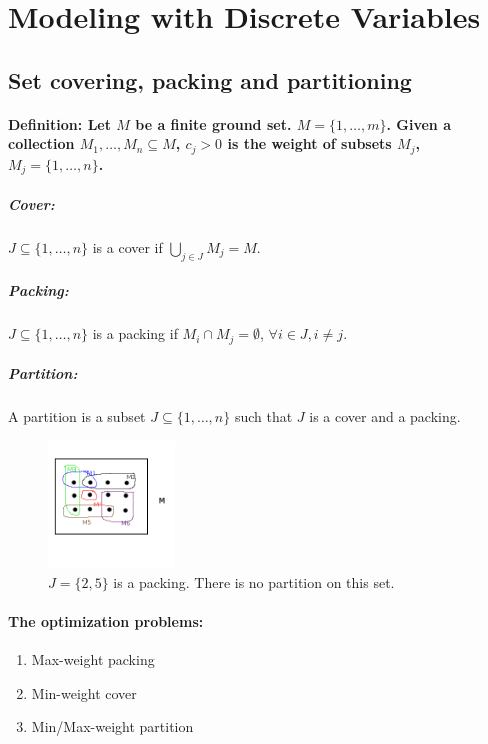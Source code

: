 \documentclass[main]{subfiles}
\begin{document}

\section{Modeling with Discrete Variables}

\subsection{Set covering, packing and partitioning}
\paragraph{Definition: Let $M$ be a finite ground set. $M = \{1, \dots, m\}$.
Given a collection $M_1, \dots, M_n \subseteq M$, $c_j > 0$ is the weight of
subsets $M_j$, $M_j = \{1, \dots, n\}$.}

\subparagraph{Cover:} $J \subseteq \{1, \dots, n\}$ is a cover if $\bigcup_{j
\in J} M_j = M$.

\subparagraph{Packing:} $J \subseteq \{1, \dots, n\}$ is a packing if $M_i \cap
M_j = \emptyset$, $\forall i \in J, i \neq j$.

\subparagraph{Partition:} A partition is a subset $J \subseteq \{1, \dots, n\}$
such that $J$ is a cover and a packing.

\begin{figure}[!h]
  \centering
    \includegraphics[width=0.3\textwidth]{imgs/partition-set.png}
    \caption{$J = \{2,5\}$ is a packing. There is no partition on this set.}
\end{figure}

\paragraph{The optimization problems:}
\begin{enumerate}
\item Max-weight packing
\item Min-weight cover
\item Min/Max-weight partition
\end{enumerate}
\end{document}
